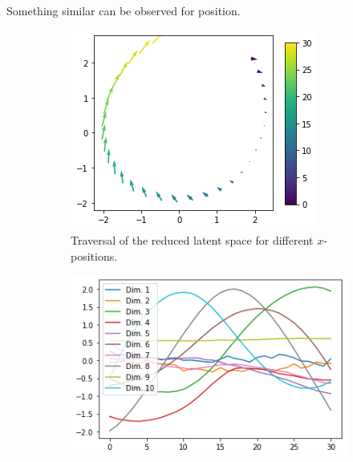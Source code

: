 Something similar can be observed for position.
\begin{figure}
    \centering
    \begin{subfigure}{.48\textwidth}
        \includegraphics[width=\textwidth]{images/latent_space_traversals/vae_dsprites_position_latent_space_route.png}
        \caption{Traversal of the reduced latent space for different $x$-positions.}
        \label{subfig:vae_dsprites_x_pos_latent_space_route}
    \end{subfigure}
    \hfill
    \begin{subfigure}{.48\textwidth}
        \includegraphics[width=\textwidth]{images/latent_space_traversals/vae_dsprites_position_latent_space_values.png}

\end{subfigure}
\end{figure}
